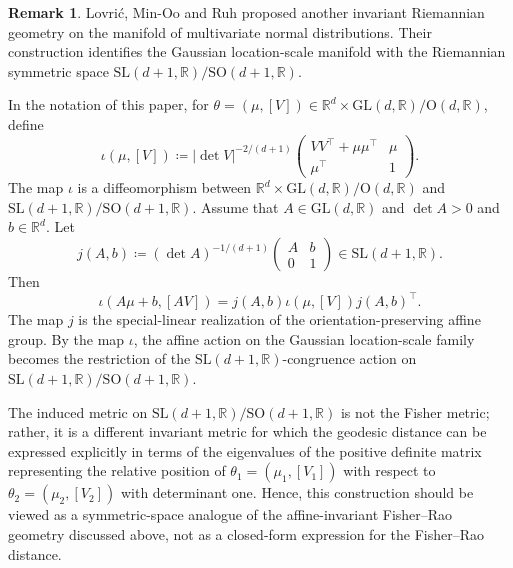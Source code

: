 \documentclass[a4paper, reqno, 11pt]{article}
\theoremstyle{definition}
\newtheorem{Rem}[Thm]{Remark}
\def\GL{\mathrm{GL}}
\def\SL{\mathrm{SL}}
\def\SO{\mathrm{SO}}
\def\O{\mathrm{O}}
\begin{document}
\begin{Rem}
Lovri\'{c}, Min-Oo and Ruh \cite{lovric2000multivariate} proposed another invariant Riemannian geometry on the manifold of multivariate normal distributions. 
Their construction identifies the Gaussian location-scale manifold with the Riemannian symmetric space $\SL(d+1,\mathbb{R})/\SO(d+1,\mathbb{R})$. 

In the notation of this paper, for $\theta = (\mu,[V]) \in \mathbb{R}^d \times \GL(d,\mathbb{R})/\O(d,\mathbb{R})$, 
define 
\[ \iota (\mu,[V]) \coloneqq |\det V|^{-2/(d+1)} \begin{pmatrix} V V^{\top} + \mu \mu^{\top} & \mu \\ \mu^{\top} & 1 \end{pmatrix}. \]
The map $\iota$ is a diffeomorphism between $\mathbb{R}^d \times \GL(d,\mathbb{R})/\O(d,\mathbb{R})$ and $\SL(d+1,\mathbb{R})/\SO(d+1,\mathbb{R})$. 
Assume that $A \in \GL(d,\mathbb{R})$ and $\det A > 0$ and $b \in \mathbb{R}^d$. 
Let 
\[ j(A,b) \coloneqq (\det A)^{-1/(d+1)} \begin{pmatrix} A & b \\ 0 & 1 \end{pmatrix} \in \SL(d+1,\mathbb{R}). \]
Then 
\[ \iota(A\mu + b, [AV]) = j(A,b) \iota(\mu, [V]) j(A,b)^{\top}.\]
The map $j$ is the special-linear realization of the orientation-preserving affine group.
By the map $\iota$, 
the affine action on the Gaussian location-scale family becomes the restriction of the $\SL(d+1,\mathbb{R})$-congruence action on $\SL(d+1,\mathbb{R})/\SO(d+1,\mathbb{R})$. 

The induced metric on $\SL(d+1,\mathbb{R})/\SO(d+1,\mathbb{R})$ is not the Fisher metric; rather, it is a different
invariant metric for which the geodesic distance can be expressed explicitly in terms of the eigenvalues of the positive definite matrix representing the relative position of $\theta_1 = (\mu_1, [V_1])$ with respect to $\theta_2 = (\mu_2, [V_2])$ with determinant one. 
Hence, this construction should be viewed as a symmetric-space analogue of the affine-invariant Fisher--Rao geometry discussed above, not as a closed-form expression for the Fisher--Rao distance.
\end{Rem}



\end{document}
